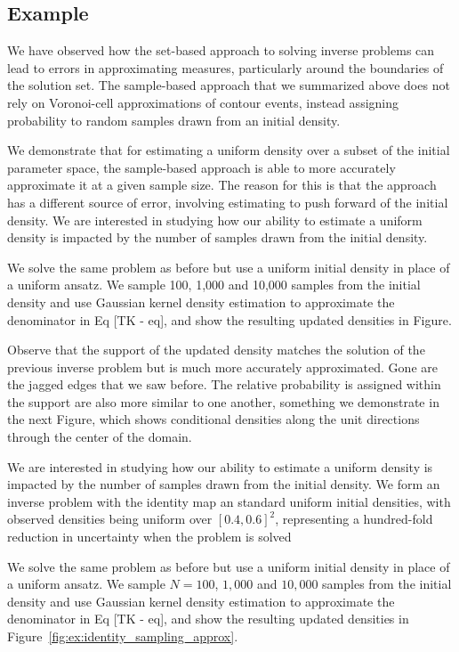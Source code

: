 \subsection{Example}\label{sec:sample-example}

We have observed how the set-based approach to solving inverse problems can lead to errors in approximating measures, particularly around the boundaries of the solution set.
The sample-based approach that we summarized above does not rely on Voronoi-cell approximations of contour events, instead assigning probability to random samples drawn from an initial density.

We demonstrate that for estimating a uniform density over a subset of the initial parameter space, the sample-based approach is able to more accurately approximate it at a given sample size.
The reason for this is that the approach has a different source of error, involving estimating to push forward of the initial density.
We are interested in studying how our ability to estimate a uniform density is impacted by the number of samples drawn from the initial density.

We solve the same problem as before but use a uniform initial density in place of a uniform ansatz.
We sample 100, 1,000 and 10,000 samples from the initial density and use Gaussian kernel density estimation to approximate the denominator in Eq [TK - eq], and show the resulting updated densities in Figure.

Observe that the support of the updated density matches the solution of the previous inverse problem but is much more accurately approximated. Gone are the jagged edges that we saw before. The relative probability is assigned within the support are also more similar to one another, something we demonstrate in the next Figure, which shows conditional densities along the unit directions through the center of the domain.

We are interested in studying how our ability to estimate a uniform density is impacted by the number of samples drawn from the initial density.
We form an inverse problem with the identity map an standard uniform initial densities, with observed densities being uniform over $[0.4, 0.6]^2$, representing a hundred-fold reduction in uncertainty when the problem is solved

We solve the same problem as before but use a uniform initial density in place of a uniform ansatz.
We sample $N=100$, $1,000$ and $10,000$ samples from the initial density and use Gaussian kernel density estimation to approximate the denominator in Eq [TK - eq], and show the resulting updated densities in Figure~\ref{fig:ex:identity_sampling_approx}.

